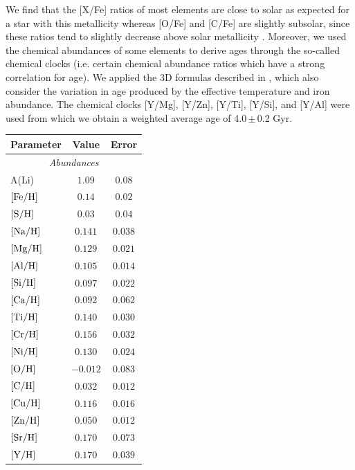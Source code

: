 \documentclass[fleqn,usenatbib]{mnras}
\newcommand{\Tstarage}{4.0\,$\pm$\,0.2 Gyr}
\begin{document}
We find that the [X/Fe] ratios of most elements are close to solar as expected for a star with this metallicity whereas [O/Fe] and [C/Fe] are slightly subsolar, since these ratios tend to slightly decrease above solar metallicity \cite[e.g.][]{Bertrandelis-15,Franchini2020}. Moreover, we used the chemical abundances of some elements to derive ages through the so-called chemical clocks (i.e. certain chemical abundance ratios which have a strong correlation for age). We applied the 3D formulas described in \citet{Delgado-19}, which also consider the variation in age produced by the effective temperature and iron abundance. The chemical clocks [Y/Mg], [Y/Zn], [Y/Ti], [Y/Si], and [Y/Al] were used from which we obtain a weighted average age of \Tstarage{}.
\begin{table}
    \centering
    \begin{tabular}{lcc}
        \hline
        \hline
        Parameter & Value & Error \\
        \hline
        \hline
        \multicolumn{3}{c}{\it Abundances}\\
        A(Li) & $1.09$ & $0.08$ \\
        $[\rm{Fe}/\rm{H}]$ & $0.14$ & $0.02$ \\
        $[\rm{S}/\rm{H}]$ & $0.03$ & $0.04$ \\
        $[\rm{Na}/\rm{H}]$ & $0.141$ & $0.038$ \\
        $[\rm{Mg}/\rm{H}]$ & $0.129$ & $0.021$ \\
        $[\rm{Al}/\rm{H}]$ & $0.105$ & $0.014$ \\
        $[\rm{Si}/\rm{H}]$ & $0.097$ & $0.022$ \\
        $[\rm{Ca}/\rm{H}]$ & $0.092$ & $0.062$ \\
        $[\rm{Ti}/\rm{H}]$ & $0.140$ & $0.030$ \\
        $[\rm{Cr}/\rm{H}]$ & $0.156$ & $0.032$ \\
        $[\rm{Ni}/\rm{H}]$ & $0.130$ & $0.024$ \\
        $[\rm{O}/\rm{H}]$ & $-0.012$ & $0.083$ \\
        $[\rm{C}/\rm{H}]$ & $0.032$ & $0.012$ \\
        $[\rm{Cu}/\rm{H}]$ & $   0.116 $ & $  0.016 $ \\
        $[\rm{Zn}/\rm{H}]$ & $   0.050 $ & $  0.012 $ \\
        $[\rm{Sr}/\rm{H}]$ & $   0.170 $ & $  0.073 $ \\
        $[\rm{Y}/\rm{H}]$ & $    0.170 $ & $  0.039 $ \\

\end{tabular}
\end{table}
\end{document}
